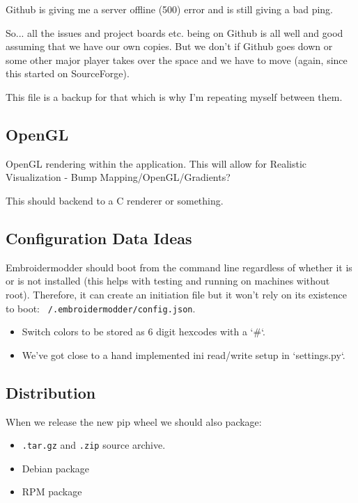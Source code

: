 \documentclass[a4paper]{report}
\begin{document}
Github is giving me a server offline (500) error and is still giving a bad ping.

So... all the issues and project boards etc. being on Github is all well and
good assuming that we have our own copies. But we don't if Github goes down or
some other major player takes over the space and we have to move (again, since
this started on SourceForge).

This file is a backup for that which is why I'm repeating myself between them.

\subsection{OpenGL}

OpenGL rendering within the application. This will allow for Realistic Visualization - Bump
Mapping/OpenGL/Gradients?

This should backend to a C renderer or something.

\subsection{Configuration Data Ideas}

Embroidermodder should boot from the command line regardless of whether it is or is not
installed (this helps with testing and running on machines without root). Therefore, it can
create an initiation file but it won't rely on its existence to boot:
\texttt{~/.embroidermodder/config.json}.

\begin{itemize}
\item Switch colors to be stored as 6 digit hexcodes with a `\#`.
\item We've got close to a hand implemented ini read/write setup in `settings.py`.
\end{itemize}

\subsection{Distribution}

When we release the new pip wheel we should also package:

\begin{itemize}
\item \texttt{.tar.gz} and \texttt{.zip} source archive.
\item Debian package
\item RPM package
\end{itemize}
\end{document}
